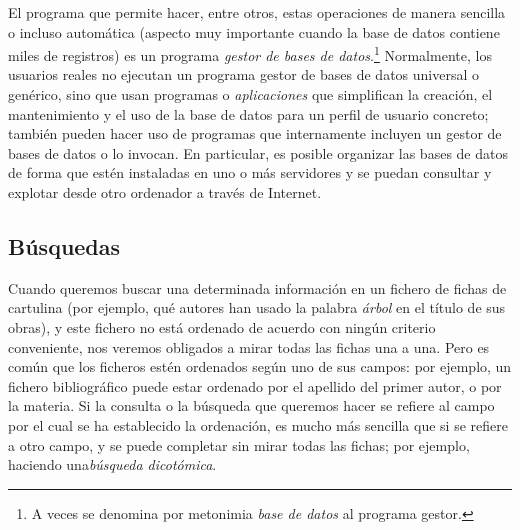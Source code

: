 \begin{itemize}
\end{itemize} El programa que permite hacer, entre otros, estas operaciones de manera sencilla o incluso automática (aspecto muy importante cuando la base de datos contiene miles de registros) es un programa \emph{gestor de bases de datos}.\footnote{A veces se denomina por metonimia \emph{base de datos} al programa gestor.} Normalmente, los usuarios reales no ejecutan un programa gestor de bases de datos universal o genérico, sino que usan programas o \emph{aplicaciones} que simplifican la creación, el mantenimiento y el uso de la base de datos para un perfil de usuario concreto; también pueden hacer uso de programas que internamente incluyen un gestor de bases de datos o lo invocan. En particular, es posible organizar las bases de datos de forma que estén instaladas en uno o más servidores y se puedan consultar y explotar desde otro ordenador a través de Internet. 

\subsection{Búsquedas} 

Cuando queremos buscar una determinada información en un fichero de fichas de cartulina (por ejemplo, qué autores han usado la palabra \emph{árbol} en el título de sus obras), y este fichero no está ordenado de acuerdo con ningún criterio conveniente, nos veremos obligados a mirar todas las fichas una a una. Pero es común que los ficheros estén ordenados según uno de sus campos: por ejemplo, un fichero bibliográfico puede estar ordenado por el apellido del primer autor, o por la materia. Si la consulta o la búsqueda que queremos hacer se refiere al campo por el cual se ha establecido la ordenación, es mucho más sencilla que si se refiere a otro campo, y se puede completar sin mirar todas las fichas; por ejemplo, haciendo una\emph{búsqueda dicotómica}. 

